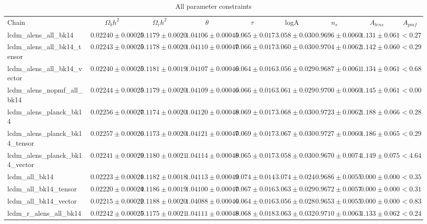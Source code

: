 \documentclass[preprint]{emulateapj}
\begin{document}
\begin{table*}[h]
\begin{center}
\caption{\label{tab:param_all} All parameter constraints}
\tiny
\begin{tabular}{l || c c c c c c c | c}
Chain & $\Omega_b h^2$  & $\Omega_c h^2$  & $\theta$  & $\tau$  & logA  & $n_s$  & $A_{lens}$  & $A_{pmf}$ \\
lcdm\_alens\_all\_bk14 & $ 0.02240\pm  0.00025$ & $ 0.1179\pm  0.0020$ & $ 1.04106\pm  0.00045$ & $ 0.065\pm  0.017$ & $ 3.058\pm  0.030$ & $ 0.9696\pm  0.0060$ & $ 1.131 \pm  0.061$ & $< 0.27$ \\
lcdm\_alens\_all\_bk14\_tensor & $ 0.02243\pm  0.00025$ & $ 0.1178\pm  0.0020$ & $ 1.04110\pm  0.00047$ & $ 0.066\pm  0.017$ & $ 3.060\pm  0.030$ & $ 0.9704\pm  0.0062$ & $ 1.142 \pm  0.060$ & $< 0.29$ \\
lcdm\_alens\_all\_bk14\_vector & $ 0.02240\pm  0.00025$ & $ 0.1181\pm  0.0019$ & $ 1.04107\pm  0.00046$ & $ 0.064\pm  0.016$ & $ 3.056\pm  0.029$ & $ 0.9687\pm  0.0061$ & $ 1.134 \pm  0.061$ & $< 0.68$ \\
lcdm\_alens\_nopmf\_all\_bk14 & $ 0.02244\pm  0.00025$ & $ 0.1179\pm  0.0020$ & $ 1.04109\pm  0.00046$ & $ 0.066\pm  0.016$ & $ 3.061\pm  0.029$ & $ 0.9700\pm  0.0060$ & $ 1.145 \pm  0.061$ & $< 0.00$ \\
lcdm\_alens\_planck\_bk14 & $ 0.02256\pm  0.00027$ & $ 0.1174\pm  0.0020$ & $ 1.04120\pm  0.00048$ & $ 0.069\pm  0.017$ & $ 3.068\pm  0.030$ & $ 0.9723\pm  0.0062$ & $ 1.188 \pm  0.066$ & $< 0.28$ \\
lcdm\_alens\_planck\_bk14\_tensor & $ 0.02257\pm  0.00026$ & $ 0.1173\pm  0.0020$ & $ 1.04121\pm  0.00047$ & $ 0.069\pm  0.017$ & $ 3.067\pm  0.030$ & $ 0.9727\pm  0.0060$ & $ 1.186 \pm  0.065$ & $< 0.29$ \\
lcdm\_alens\_planck\_bk14\_vector & $ 0.02241\pm  0.00029$ & $ 0.1180\pm  0.0021$ & $ 1.04114\pm  0.00048$ & $ 0.065\pm  0.017$ & $ 3.058\pm  0.030$ & $ 0.9670\pm  0.0074$ & $ 1.149 \pm  0.075$ & $< 4.64$ \\
lcdm\_all\_bk14 & $ 0.02223\pm  0.00021$ & $ 0.1182\pm  0.0018$ & $ 1.04113\pm  0.00049$ & $ 0.074\pm  0.014$ & $ 3.074\pm  0.024$ & $ 0.9686\pm  0.0055$ & $ 0.000 \pm  0.000$ & $< 0.35$ \\
lcdm\_all\_bk14\_tensor & $ 0.02220\pm  0.00024$ & $ 0.1186\pm  0.0019$ & $ 1.04100\pm  0.00047$ & $ 0.067\pm  0.016$ & $ 3.063\pm  0.029$ & $ 0.9672\pm  0.0057$ & $ 0.000 \pm  0.000$ & $< 0.31$ \\
lcdm\_all\_bk14\_vector & $ 0.02215\pm  0.00022$ & $ 0.1188\pm  0.0020$ & $ 1.04088\pm  0.00046$ & $ 0.064\pm  0.016$ & $ 3.056\pm  0.028$ & $ 0.9653\pm  0.0055$ & $ 0.000 \pm  0.000$ & $< 0.83$ \\
lcdm\_r\_alens\_all\_bk14 & $ 0.02242\pm  0.00025$ & $ 0.1175\pm  0.0021$ & $ 1.04111\pm  0.00048$ & $ 0.068\pm  0.018$ & $ 3.063\pm  0.032$ & $ 0.9710\pm  0.0063$ & $ 1.133 \pm  0.062$ & $< 0.24$ \\
\end{tabular}
 \normalsize
\end{center}
\end{table*}
\end{document}

